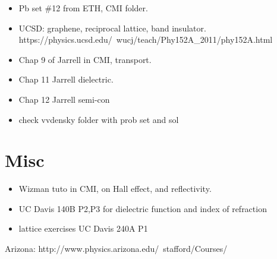 \begin{itemize}
\item Pb set \#12 from ETH, CMI folder.
\item UCSD: graphene, reciprocal lattice, band
  insulator. https://physics.ucsd.edu/~wucj/teach/Phy152A_2011/phy152A.html
\item Chap 9 of Jarrell in CMI, transport.
\item Chap 11 Jarrell dielectric.
\item Chap 12 Jarrell semi-con
\item check vvdensky folder with prob set and sol
\end{itemize}

\section{Misc}
\begin{itemize}
\item Wizman tuto in CMI, on Hall effect, and reflectivity.
\item UC Davis 140B P2,P3 for dielectric function and index of
  refraction
\item lattice exercises UC Davis 240A P1
\end{itemize}

Arizona: http://www.physics.arizona.edu/~stafford/Courses/



